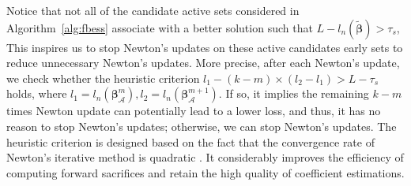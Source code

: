 
Notice that not all of the candidate active sets considered in Algorithm~\ref{alg:fbess} associate with a better solution such that $L - l_{n}(\tilde{\boldsymbol{\beta}}) > \tau_s$,
This inspires us to stop Newton's updates on these active candidates early sets to reduce unnecessary Newton's updates.
More precise, after each Newton's update, we check whether the heuristic criterion
$l_1 - (k - m) \times (l_2 - l_1) > L - \tau_s$ holds,
where $l_1 = l_n({\boldsymbol\beta}_{\mathcal{A}}^{m}), l_2 = l_n({\boldsymbol\beta}_{\mathcal{A}}^{m+1})$.
If so, it implies the remaining $k - m$ times Newton update can potentially lead to a lower loss, and thus,
it has no reason to stop Newton's updates; otherwise, we can stop Newton's updates.
The heuristic criterion is designed based on the fact that the convergence rate of Newton's iterative method is quadratic \citep{nocedalNumericalOptimization1999}.
It considerably improves the efficiency of computing forward sacrifices and
retain the high quality of coefficient estimations.

